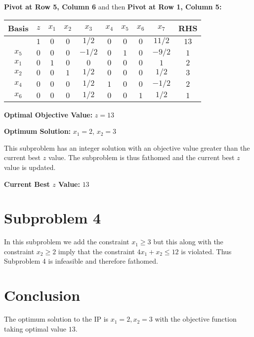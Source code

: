 \documentclass{article}[12pt,a4paper]
\begin{document}
\begin{enumerate}
  	  \noindent \textbf{Pivot at Row 5, Column 6} and then \textbf{Pivot at Row 1, Column 5:}
  	  \begin{center}
 	   \begin{tabular}{c | c | c c c c c c c | c}
            		Basis & $z$ & $x_1$ & $x_2$ & $x_3$ & $x_4$ & $x_5$ & $x_6$ & $x_7$ & RHS \\ \hline
  			           & $1$ & $0$ & $0$   & $1/2$ & $0$     & $0$ & $0$ & $11/2$ & $13$  \\ \hline
  			$x_5$ & $0$ & $0$ & $0$ & $-1/2$   & $0$    & $1$  & $0$ & $-9/2$ & $1$ \\
  			$x_1$ & $0$ & $1$ & $0$  &  $0$    & $0$      & $0$ & $0$ & $1$ & $2$ \\
  			$x_2$ & $0$ & $0$ & $1$ &   $1/2$    & $0$ & $0$ & $0$ & $1/2$ & $3$ \\
  			$x_4$ & $0$ & $0$ & $0$ &   $1/2$    & $1$ & $0$ & $0$ & $-1/2$ & $2$ \\
  			$x_6$ & $0$ & $0$ & $0$ &   $1/2$    & $0$ & $0$ & $1$ & $1/2$ & $1$ \\
  	  \end{tabular}
  	  \end{center}
  	  \pagebreak
  	  
  	   \textbf{Optimal Objective Value:} $z = 13$
  	  
  	  \noindent \textbf{Optimum Solution:} $x_1 = 2$, $x_2 = 3$
  	  
  	  \noindent This subproblem has an integer solution with an objective value greater than the current best $z$ value.
  	  The subproblem is thus fathomed and the current best $z$ value is updated.
  	  
  	  \noindent \textbf{Current Best $z$ Value:} $13$
  	  
  	   \noindent \section*{Subproblem 4}
  	   In this subproblem we add the constraint $x_1 \ge 3$ but this along with the constraint $x_2 \ge 2$
  	   imply that the constraint $4x_1 + x_2 \le 12$ is violated. Thus Subproblem 4 is infeasible and therefore fathomed.
  	   
  	   \noindent \section*{Conclusion}
  	   The optimum solution to the IP is $x_1 = 2, x_2 = 3$ with the objective function taking optimal value $13$.
  	   

\end{enumerate}
\end{document}
